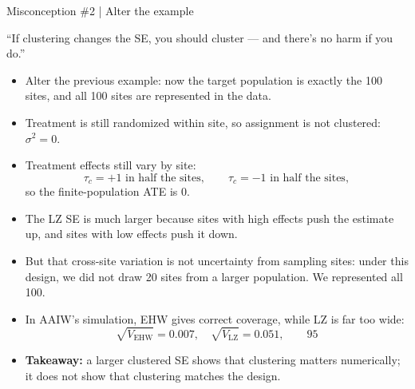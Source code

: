 \documentclass[11pt,aspectratio=169]{beamer}
\newcommand{\bx}[1]{\textbf{#1}}
\begin{document}
\begin{frame}{Misconception \#2 | Alter the example}
\begin{block}{\normalsize ``If clustering changes the SE, you should cluster --- and there's no harm if you do.''}
\end{block}

\footnotesize
\setlength{\abovedisplayskip}{2pt}
\setlength{\belowdisplayskip}{2pt}
\begin{itemize}\setlength{\itemsep}{1pt}
\item Alter the previous example: now the target population is exactly the 100 sites, and all 100 sites are represented
in the data.

\item Treatment is still randomized within site, so assignment is not clustered: $\sigma^2=0$.

\item Treatment effects still vary by site:
\[
\tau_c = +1 \text{ in half the sites}, \qquad \tau_c = -1 \text{ in half the sites},
\]
so the finite-population ATE is $0$.

\item The LZ SE is much larger because sites with high effects push the estimate up, and sites with low effects
push it down.

\item But that cross-site variation is not uncertainty from sampling sites: under this design, we did not draw
20 sites from a larger population. We represented all 100.

\item In AAIW's simulation, EHW gives correct coverage, while LZ is far too wide:
\[
\sqrt{V_{\mathrm{EHW}}}=0.007,\quad
\sqrt{V_{\mathrm{LZ}}}=0.051,
\qquad
95%
\]

\item \bx{Takeaway:} a larger clustered SE shows that clustering matters numerically; it does not show that
clustering matches the design.
\end{itemize}
\end{frame}
\end{document}
